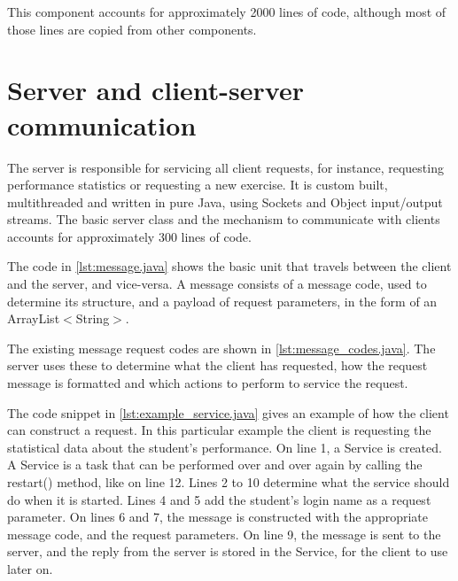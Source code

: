 This component accounts for approximately 2000 lines of code, although most of those lines are copied from other components.

\section{Server and client-server communication}
The server is responsible for servicing all client requests, for instance, requesting performance statistics or requesting a new exercise. It is custom built, multithreaded and written in pure Java, using Sockets and Object input/output streams. The basic server class and the mechanism to communicate with clients accounts for approximately 300 lines of code. \newline


The code in \ref{lst:message.java} shows the basic unit that travels between the client and the server, and vice-versa. A message consists of a message code, used to determine its structure, and a payload of request parameters, in the form of an \textsf{ArrayList$<$String$>$}.\newline

The existing message request codes are shown in \ref{lst:message_codes.java}. The server uses these to determine what the client has requested, how the request message is formatted and which actions to perform to service the request. \newpage



The code snippet in \ref{lst:example_service.java} gives an example of how the client can construct a request. In this particular example the client is requesting the statistical data about the student's performance. On line 1, a \textsf{Service} is created. A \textsf{Service} is a task that can be performed over and over again by calling the \textsf{restart()} method, like on line 12. Lines 2 to 10 determine what the service should do when it is started. Lines 4 and 5 add the student's login name as a request parameter. On lines 6 and 7, the message is constructed with the appropriate message code, and the request parameters. On line 9, the message is sent to the server, and the reply from the server is stored in the \textsf{Service}, for the client to use later on.\newline

